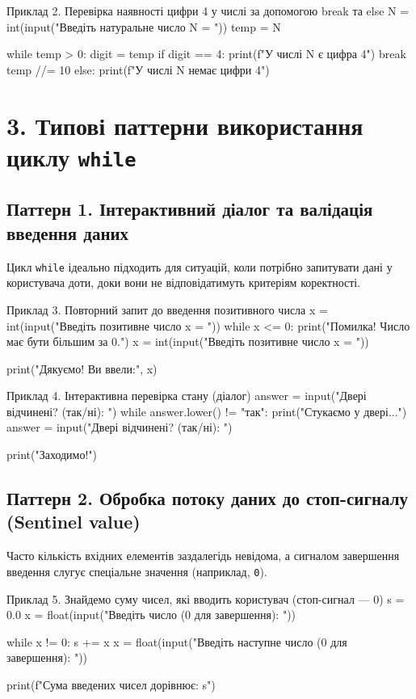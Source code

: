 \documentclass{scrreprt}
\begin{document}
	\begin{py}{Приклад 2. Перевірка наявності цифри 4 у числі за допомогою break та else}
N = int(input("Введіть натуральне число N = "))
temp = N

while temp > 0:
    digit = temp %
    if digit == 4:
        print(f"У числі {N} є цифра 4")
        break
    temp //= 10
else:
    print(f"У числі {N} немає цифри 4")
	\end{py}
	
	\section*{3. Типові паттерни використання циклу \texttt{while}}
	
	\subsection*{Паттерн 1. Інтерактивний діалог та валідація введення даних}
	
	Цикл \texttt{while} ідеально підходить для ситуацій, коли потрібно запитувати дані у користувача доти, доки вони не відповідатимуть критеріям коректності.
	
	\begin{py}{Приклад 3. Повторний запит до введення позитивного числа}
x = int(input("Введіть позитивне число x = "))
while x <= 0:
    print("Помилка! Число має бути більшим за 0.")
    x = int(input("Введіть позитивне число x = "))

print("Дякуємо! Ви ввели:", x)
	\end{py}
	
	\begin{py}{Приклад 4. Інтерактивна перевірка стану (діалог)}
answer = input("Двері відчинені? (так/ні): ")
while answer.lower() != "так":
    print("Стукаємо у двері...")
    answer = input("Двері відчинені? (так/ні): ")

print("Заходимо!")
	\end{py}
	
	\newpage
	
	\subsection*{Паттерн 2. Обробка потоку даних до стоп-сигналу (Sentinel value)}
	
	Часто кількість вхідних елементів заздалегідь невідома, а сигналом завершення введення слугує спеціальне значення (наприклад, \texttt{0}).
	
	\begin{py}{Приклад 5. Знайдемо суму чисел, які вводить користувач (стоп-сигнал — 0)}
s = 0.0
x = float(input("Введіть число (0 для завершення): "))

while x != 0:
    s += x
    x = float(input("Введіть наступне число (0 для завершення): "))

print(f"Сума введених чисел дорівнює: {s}")
	\end{py}
	
\end{document}
